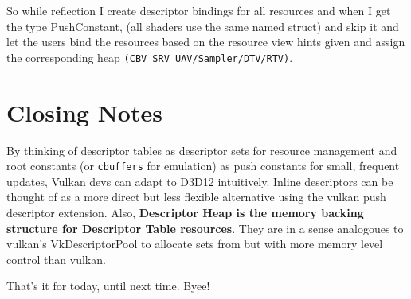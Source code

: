 \documentclass{article}
\begin{document}
So while reflection I create descriptor bindings for all resources and when I get the type PushConstant, (all shaders use the same named struct) and skip it and let the users bind the resources based on the resource view hints given and assign the corresponding heap \lstinline{(CBV_SRV_UAV/Sampler/DTV/RTV)}.  

\section*{Closing Notes}

By thinking of descriptor tables as descriptor sets for resource management and root constants (or \texttt{cbuffers} for emulation) as push constants for small, frequent updates, Vulkan devs can adapt to D3D12 intuitively. Inline descriptors can be thought of as a more direct but less flexible alternative using the vulkan push descriptor extension.  Also, \textbf{Descriptor Heap is the memory backing structure for Descriptor Table resources}. They are in a sense analogoues to vulkan's {VkDescriptorPool} to allocate sets from but with more memory level control than vulkan.

That's it for today, until next time. Byee!
\end{document}
